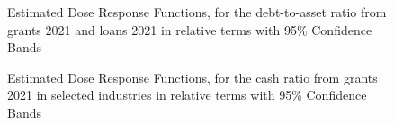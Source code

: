 \begin{figure}
    \centering
    
    \decoRule
    \caption[Response curves for indebtedness through aid]{Estimated Dose Response Functions, for the debt-to-asset ratio from grants 2021 and loans 2021 in relative terms with 95\% Confidence Bands}
    \label{fig:Curve2}
\end{figure}


\begin{figure}
    \centering
    
    \decoRule
    \caption[Response curves for liquidity through aid - by sectors 1]{Estimated Dose Response Functions, for the cash ratio from grants 2021 in selected industries in relative terms with 95\% Confidence Bands}
    \label{fig:Curve3}
\end{figure}


